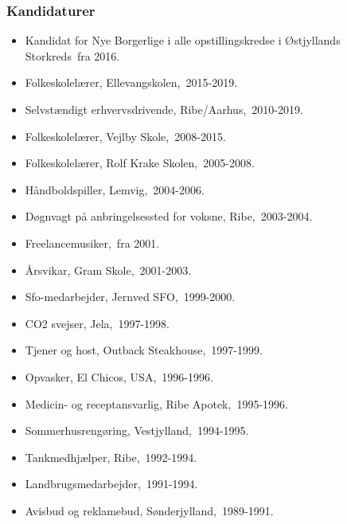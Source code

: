 \documentclass[11pt, a4paper]{awesome-cv}
\begin{document}
\begin{cvletter}
\subsubsection*{Kandidaturer}
\begin{itemize}
\item Kandidat for Nye Borgerlige i alle opstillingskredse i Østjyllands Storkreds fra 2016.
\end{itemize}
\begin{itemize}
\item Folkeskolelærer, Ellevangskolen, 2015-2019.
\item Selvstændigt erhvervsdrivende, Ribe/Aarhus, 2010-2019.
\item Folkeskolelærer, Vejlby Skole, 2008-2015.
\item Folkeskolelærer, Rolf Krake Skolen, 2005-2008.
\item Håndboldspiller, Lemvig, 2004-2006.
\item Døgnvagt på anbringelsessted for voksne, Ribe, 2003-2004.
\item Freelancemusiker, fra 2001.
\item Årsvikar, Gram Skole, 2001-2003.
\item Sfo-medarbejder, Jernved SFO, 1999-2000.
\item CO2 svejser, Jela, 1997-1998.
\item Tjener og host, Outback Steakhouse, 1997-1999.
\item Opvasker, El Chicos, USA, 1996-1996.
\item Medicin- og receptansvarlig, Ribe Apotek, 1995-1996.
\item Sommerhusrengøring, Vestjylland, 1994-1995.
\item Tankmedhjælper, Ribe, 1992-1994.
\item Landbrugsmedarbejder, 1991-1994.
\item Avisbud og reklamebud, Sønderjylland, 1989-1991.
\end{itemize}
\end{cvletter}
\end{document}
